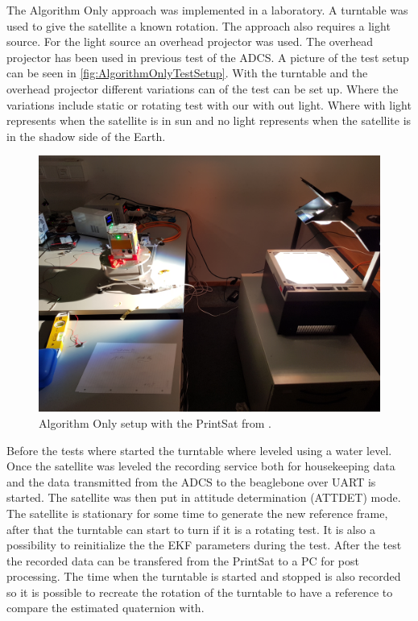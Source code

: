 The Algorithm Only approach was implemented in a laboratory. A turntable was used to give the satellite a known rotation. The approach also requires a light source. For the light source an overhead projector was used. The overhead projector has been used in previous test of the ADCS. A picture of the test setup can be seen in \autoref{fig:AlgorithmOnlyTestSetup}. With the turntable and the overhead projector different variations can of the test can be set up. Where the variations include static or rotating test with our with out light. Where with light represents when the satellite is in sun and no light represents when the satellite is in the shadow side of the Earth. 

\begin{figure}[tbp]
	\centering
	\includegraphics[width=0.5\columnwidth]{./Pictures/Indoor}
	\caption{Algorithm Only setup with the PrintSat from \cite{DavidThesis}.}
	\label{fig:AlgorithmOnlyTestSetup}
\end{figure} 

Before the tests where started the turntable where leveled using a water level. Once the satellite was leveled the recording service both for housekeeping data and the data transmitted from the ADCS to the beaglebone over UART is started. The satellite was then put in attitude determination (ATTDET) mode. The satellite is stationary for some time to generate the new reference frame, after that the turntable can start to turn if it is a rotating test. It is also a possibility to reinitialize the the EKF parameters during the test. After the test the recorded data can be transfered from the PrintSat to a PC for post processing. The time when the turntable is started and stopped is also recorded so it is possible to recreate the rotation of the turntable to have a reference to compare the estimated quaternion with. 

